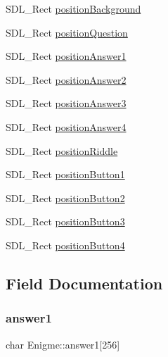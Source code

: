 \begin{DoxyCompactItemize}
\item 
S\+D\+L\+\_\+\+Rect \mbox{\hyperlink{structEnigme_a1d459d9f8bc1a00e3dd51e9aabb478ec}{position\+Background}}
\item 
S\+D\+L\+\_\+\+Rect \mbox{\hyperlink{structEnigme_ad1e0135d95f1a6f6ac47805c6b21e1e4}{position\+Question}}
\item 
S\+D\+L\+\_\+\+Rect \mbox{\hyperlink{structEnigme_a5a9eb17fd4a5575868517c13ab5560e1}{position\+Answer1}}
\item 
S\+D\+L\+\_\+\+Rect \mbox{\hyperlink{structEnigme_aa75583284f7f5997a2253a833309a6e1}{position\+Answer2}}
\item 
S\+D\+L\+\_\+\+Rect \mbox{\hyperlink{structEnigme_a54321819d8085721a815e45dc1ba0686}{position\+Answer3}}
\item 
S\+D\+L\+\_\+\+Rect \mbox{\hyperlink{structEnigme_a647f36c81658cf4a9d3d2caa8682c179}{position\+Answer4}}
\item 
S\+D\+L\+\_\+\+Rect \mbox{\hyperlink{structEnigme_af7ce12ea7f83774a77950d58f07a4922}{position\+Riddle}}
\item 
S\+D\+L\+\_\+\+Rect \mbox{\hyperlink{structEnigme_a915cc9358b4d14452966dcc170cb9b5a}{position\+Button1}}
\item 
S\+D\+L\+\_\+\+Rect \mbox{\hyperlink{structEnigme_a0bd08bbd1877d4adb95fc1d64debc5df}{position\+Button2}}
\item 
S\+D\+L\+\_\+\+Rect \mbox{\hyperlink{structEnigme_a62f844bf66f4821d9bb33bf45b847b25}{position\+Button3}}
\item 
S\+D\+L\+\_\+\+Rect \mbox{\hyperlink{structEnigme_adcfb57288500a70f60ef989d46b65742}{position\+Button4}}
\end{DoxyCompactItemize}


\subsection{Field Documentation}
\mbox{\label{structEnigme_af8fefd1ff1ab98d6171a4862276b3a97}} 
\subsubsection{\texorpdfstring{answer1}{answer1}}
{\footnotesize\ttfamily char Enigme\+::answer1\mbox{[}256\mbox{]}}

\mbox{\label{structEnigme_a3e80b6f171c8a30ecfb095ede30c9702}} 

